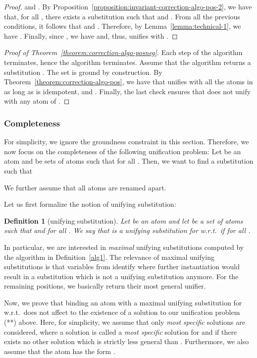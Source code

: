 \documentclass[fleqn]{tlp}
\newtheorem{definition}{Definition} \newtheorem{example}{Example} \newtheorem{lemma}{Lemma} \newtheorem{proposition}{Proposition} \newtheorem{theorem}{Theorem} \newtheorem{corollary}{Corollary}
\begin{document}
\begin{appendix}
\begin{proof}
  and .
By Proposition~\ref{proposition:invariant-correction-algo-pos-2}, we
  have that, for all , there exists a substitution
   such that  and
  . 
From all the previous conditions, it follows that
   and
  . Therefore, by
  Lemma~\ref{lemma:technical-1}, we have
  .  Finally, since
  , we have 
  and, thus,  unifies with .
\end{proof}

\begin{proof}[Proof of Theorem~\ref{theorem:correction-algo-posneg}]
  Each step of the algorithm terminates, hence the algorithm terminates.
  Assume that the algorithm returns a substitution .
  The set  is ground by construction.
By Theorem~\ref{theorem:correction-algo-pos}, we have that  unifies with all the atoms in  as long as
   is idempotent,  and
  . Finally, the last check ensures that
   does not unify with any atom of .
\end{proof}

\subsubsection{Completeness} \label{sec:completeness}

For simplicity, we ignore the groundness constraint in this
section. Therefore, we now focus on the completeness of the following
unification problem: Let  be an atom and  be sets of
atoms such that  for all . Then, we
want to find a substitution  such that

We further assume that all atoms are renamed apart. 

Let us first formalize the notion of unifying substitution:

\begin{definition}[unifying substitution]
  Let  be an atom and let  be a set of atoms such that
   and  for all
  . We say that  is a unifying substitution for 
  w.r.t.\  if  for all .
\end{definition}
In particular, we are interested in \emph{maximal} unifying
substitutions computed by the algorithm in Definition~\ref{alg1}.
The relevance of maximal unifying substitutions is that variables from
 identify where further instantiation would result in a
substitution which is not a unifying substitution anymore.
For the remaining positions, we basically return their most general
unifier.

Now, we prove that binding an atom  with a maximal unifying
substitution for  w.r.t.\  does not affect to the existence
of a solution to our unification problem (**) above.
Here, for simplicity, we assume that only \emph{most specific}
solutions are considered, where a solution  is called a
\emph{most specific} solution for  and  if there
exists no other solution which is strictly less general than .
Furthermore, we also assume that the atom  has the form
.


\end{appendix}
\end{document}
